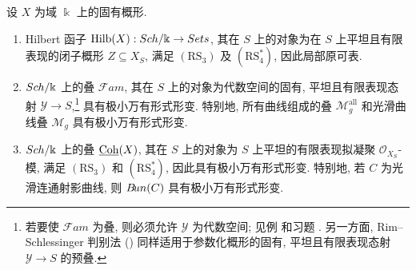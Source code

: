 \begin{proposition}\label{src:C.4.14}
设 $X$ 为域 $\Bbbk$ 上的固有概形.
\begin{enumerate}[(1)]
\item Hilbert 函子 $\operatorname{Hilb}(X):Sch/\Bbbk\to Sets$, 其在 $S$ 上的对象为在 $S$ 上平坦且有限表现的闭子概形 $Z\subseteq X_S$, 满足 $(\mathrm{RS}_3)$ 及 $(\mathrm{RS}_4^*)$, 因此局部原可表.
\item $Sch/\Bbbk$ 上的叠 $\mathcal{F}am$, 其在 $S$ 上的对象为代数空间的固有, 平坦且有限表现态射 $\mathcal Y\to S$,\footnote{若要使 $\mathcal{F}am$ 为叠, 则必须允许 $\mathcal Y$ 为代数空间; 见例  和习题 . 另一方面, Rim--Schlessinger 判别法 () 同样适用于参数化概形的固有, 平坦且有限表现态射 $\mathcal Y\to S$ 的预叠.} 具有极小万有形式形变. 特别地, 所有曲线组成的叠 $\mathcal M_g^{\mathrm{all}}$ 和光滑曲线叠 $\mathcal M_g$ 具有极小万有形式形变.
\item $Sch/\Bbbk$ 上的叠 $\underline{\mathrm{Coh}}(X)$, 其在 $S$ 上的对象为 $S$ 上平坦的有限表现拟凝聚 $\mathcal O_{X_S}$-模, 满足 $(\mathrm{RS}_3)$ 和 $(\mathrm{RS}_4^*)$, 因此具有极小万有形式形变. 特别地, 若 $C$ 为光滑连通射影曲线, 则 $B\!un(C)$ 具有极小万有形式形变.
\end{enumerate}
\end{proposition}
